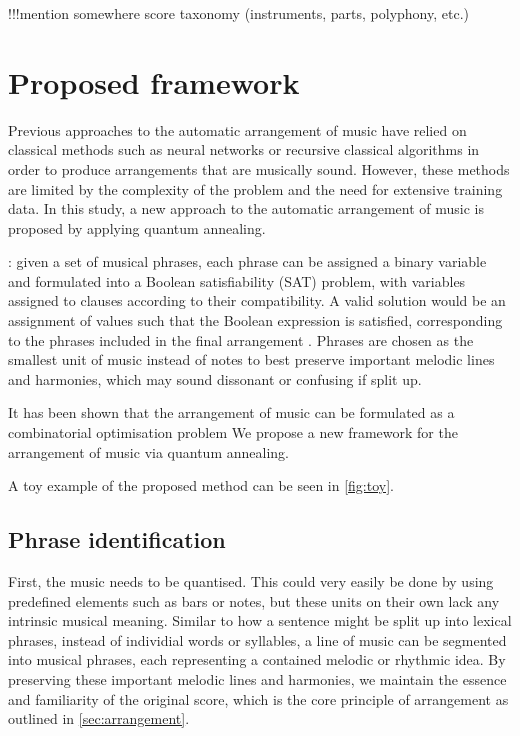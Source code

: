 \documentclass[12pt]{article}
\theoremstyle{definition}
\begin{document}
!!!mention somewhere score taxonomy (instruments, parts, polyphony, etc.)

\section{Proposed framework}

Previous approaches to the automatic arrangement of music have relied on classical methods such as neural networks  or recursive classical algorithms in order to produce arrangements that are musically sound. However, these methods are limited by the complexity of the problem and the need for extensive training data. In this study, a new approach to the automatic arrangement of music is proposed by applying quantum annealing.

: given a set of musical phrases, each phrase can be assigned a binary variable and formulated into a Boolean satisfiability (SAT) problem, with variables assigned to clauses according to their compatibility. A valid solution would be an assignment of values such that the Boolean expression is satisfied, corresponding to the phrases included in the final arrangement . Phrases are chosen as the smallest unit of music instead of notes to best preserve important melodic lines and harmonies, which may sound dissonant or confusing if split up.

It has been shown that the arrangement of music can be formulated as a combinatorial optimisation problem \cite{moses_computational_2016}
We propose a new framework for the arrangement of music via quantum annealing.

A toy example of the proposed method can be seen in \cref{fig:toy}.

\subsection{Phrase identification}

First, the music needs to be quantised. This could very easily be done by using predefined elements such as bars or notes, but these units on their own lack any intrinsic musical meaning. Similar to how a sentence might be split up into lexical phrases, instead of individial words or syllables, a line of music can be segmented into musical phrases, each representing a contained melodic or rhythmic idea. By preserving these important melodic lines and harmonies, we maintain the essence and familiarity of the original score, which is the core principle of arrangement as outlined in \cref{sec:arrangement}.
\end{document}
